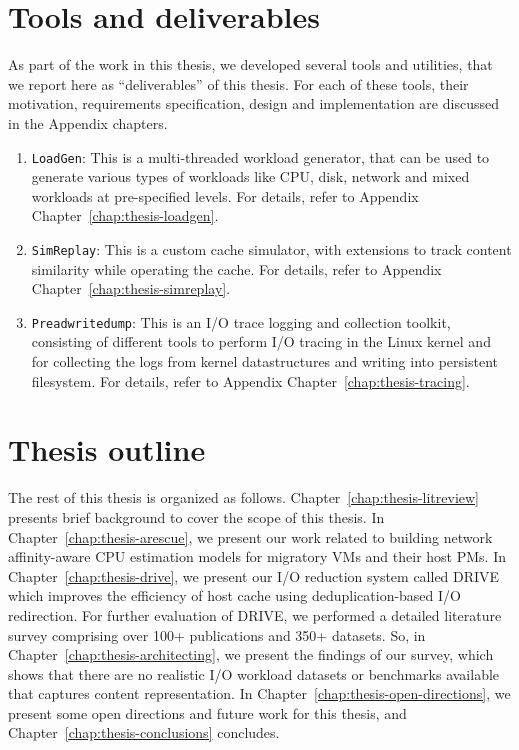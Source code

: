 \section{Tools and deliverables}
As part of the work in this thesis, we developed several tools and utilities,
that we report here as ``deliverables'' of this thesis. For each of these
tools, their motivation, requirements specification, design and 
implementation are discussed in the Appendix chapters.
\begin{enumerate}
	\item \texttt{LoadGen}: This is a multi-threaded workload generator, 
		that can be used to generate various types of workloads like
		CPU, disk, network and mixed workloads at pre-specified levels.
		For details, refer to Appendix Chapter~\ref{chap:thesis-loadgen}.
	\item \texttt{SimReplay}: This is a custom cache simulator, with 
		extensions to track content similarity while operating 
		the cache. For details, refer to Appendix 
		Chapter~\ref{chap:thesis-simreplay}.
	\item \texttt{Preadwritedump}: This is an I/O trace logging and
		collection toolkit, consisting of different tools to perform
		I/O tracing in the Linux kernel and for collecting the logs
		from kernel datastructures and writing 
		into persistent filesystem. For details, refer to Appendix 
        Chapter~\ref{chap:thesis-tracing}.
\end{enumerate}

\section{Thesis outline}
The rest of this thesis is organized as follows. 
Chapter~\ref{chap:thesis-litreview} presents brief background 
to cover the scope of this thesis.
In Chapter~\ref{chap:thesis-arescue}, we present our work
related to building network affinity-aware CPU estimation models 
for migratory VMs and their host PMs. In Chapter~\ref{chap:thesis-drive},
we present our I/O reduction system called DRIVE which
improves the efficiency of host cache using deduplication-based
I/O redirection. For further evaluation of DRIVE, we 
performed a detailed literature survey comprising over 100+
publications and 350+ datasets. So, in 
Chapter~\ref{chap:thesis-architecting},
we present the findings of our survey, 
which shows that there are no realistic I/O workload datasets 
or benchmarks available that captures content representation.
In Chapter~\ref{chap:thesis-open-directions}, we present
some open directions and future work for this thesis,
and Chapter~\ref{chap:thesis-conclusions} concludes.

